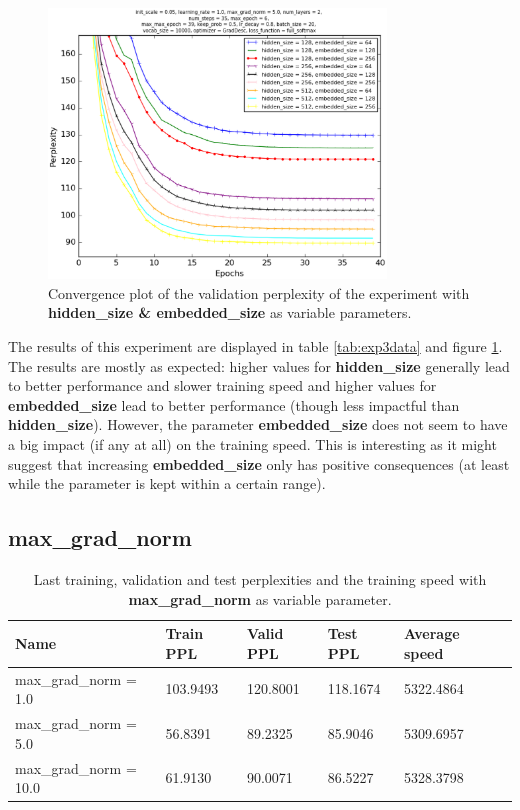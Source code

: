 \documentclass[10pt,a4paper,titlepage]{article}
\begin{document}
\begin{figure}[H]
	\begin{center}
		\includegraphics[width=0.80\textwidth]{Figures/hiddenembeddedperf.eps}
		\caption{Convergence plot of the validation perplexity of the experiment with \textbf{hidden\_size \& embedded\_size} as variable parameters.}
		\label{fig:exp3perf}
	\end{center}	
\end{figure}

The results of this experiment are displayed in table \ref{tab:exp3data} and figure \ref{fig:exp3perf}. The results are mostly as expected: higher values for \textbf{hidden\_size} generally lead to better performance and slower training speed and higher values for \textbf{embedded\_size} lead to better performance (though less impactful than \textbf{hidden\_size}). However, the parameter \textbf{embedded\_size} does not seem to have a big impact (if any at all) on the training speed. This is interesting as it might suggest that increasing \textbf{embedded\_size} only has positive consequences (at least while the parameter is kept within a certain range).
\newpage

\subsection{max\_grad\_norm}

\begin{table}[H]
\centering
\caption{Last training, validation and test perplexities and the training speed with \textbf{max\_grad\_norm} as variable parameter.}
\label{tab:exp4data}
\begin{tabular}{|l|l|l|l|l|l|}
\hline
{\small Name} & {\small Train PPL} & {\small Valid PPL} & {\small Test PPL} & {\small Average speed}\\ \hline
{\small max\_grad\_norm = 1.0}                           & 103.9493   & 120.8001   & 118.1674   & 5322.4864  \\ \hline
{\small max\_grad\_norm = 5.0 }                          & 56.8391    & 89.2325    & 85.9046    & 5309.6957  \\ \hline
{\small max\_grad\_norm = 10.0 }                         & 61.9130    & 90.0071    & 86.5227    & 5328.3798  \\ \hline
\end{tabular}
\end{table}
\end{document}
